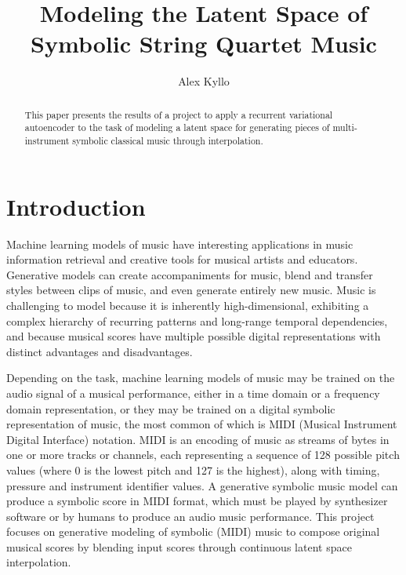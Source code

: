 \documentclass[sigconf,authorversion]{acmart}
\begin{document}
\renewcommand\footnotetextcopyrightpermission[1]{}
\pagestyle{plain}
\title{Modeling the Latent Space of Symbolic String Quartet Music}


\author{Alex Kyllo}

\begin{abstract}
  This paper presents the results of a project to apply a recurrent
  variational autoencoder to the task of modeling a latent space for
  generating pieces of multi-instrument symbolic classical music
  through interpolation.
\end{abstract}


\maketitle

\section{Introduction}

Machine learning models of music have interesting applications in
music information retrieval and creative tools for musical artists and
educators. Generative models can create accompaniments for music,
blend and transfer styles between clips of music, and even generate
entirely new music. Music is challenging to model because it is
inherently high-dimensional, exhibiting a complex hierarchy of
recurring patterns and long-range temporal dependencies, and because
musical scores have multiple possible digital representations with
distinct advantages and disadvantages.

Depending on the task, machine learning models of music may be trained
on the audio signal of a musical performance, either in a time domain
or a frequency domain representation, or they may be trained on a
digital symbolic representation of music, the most common of which is
MIDI (Musical Instrument Digital Interface) notation. MIDI is an
encoding of music as streams of bytes in one or more tracks or
channels, each representing a sequence of 128 possible pitch values
(where 0 is the lowest pitch and 127 is the highest), along with
timing, pressure and instrument identifier values. A generative
symbolic music model can produce a symbolic score in MIDI format,
which must be played by synthesizer software or by humans to produce
an audio music performance. This project focuses on generative
modeling of symbolic (MIDI) music to compose original musical scores
by blending input scores through continuous latent space interpolation.
\end{document}
